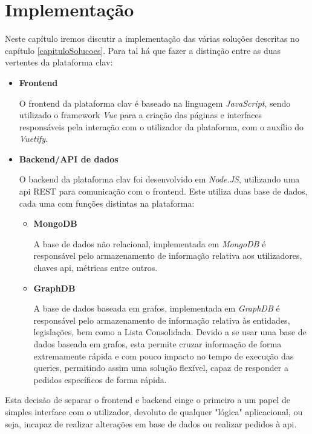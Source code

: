 \chapter{Implementação} \label{implementacao}

Neste capítulo iremos discutir a implementação das várias soluções descritas no capítulo \ref{capituloSolucoes}. Para tal há que fazer a distinção entre as duas vertentes da plataforma \gls{clav}:

\begin{itemize}
    \item \textbf{Frontend}
    
    O frontend da plataforma \gls{clav} é baseado na linguagem \emph{JavaScript}, sendo utilizado o framework \emph{Vue} para a criação das páginas e interfaces responsáveis pela interação com o utilizador da plataforma, com o auxílio do \emph{Vuetify}.
    
    \item \textbf{Backend/API de dados}
    
    O backend da plataforma \gls{clav} foi desenvolvido em \emph{Node.JS}, utilizando uma \gls{api} REST para comunicação com o frontend. Este utiliza duas base de dados, cada uma com funções distintas na plataforma:
    
    \begin{itemize}
        \item \textbf{MongoDB}
        
        A base de dados não relacional, implementada em \emph{MongoDB} é responsável pelo armazenamento de informação relativa aos utilizadores, chaves \gls{api}, métricas entre outros.
        
        \item \textbf{GraphDB}
        
        A base de dados baseada em grafos, implementada em \emph{GraphDB} é responsável pelo armazenamento de informação relativa às entidades, legislações, bem como a Lista Consolidada. Devido a se usar uma base de dados baseada em grafos, esta permite cruzar informação de forma extremamente rápida e com pouco impacto no tempo de execução das queries, permitindo assim uma solução flexível, capaz de responder a pedidos específicos de forma rápida.
    \end{itemize}
\end{itemize}

Esta decisão de separar o frontend e backend cinge o primeiro a um papel de simples interface com o utilizador, devoluto de qualquer "lógica" aplicacional, ou seja, incapaz de realizar alterações em base de dados ou realizar pedidos à \gls{api}. 

